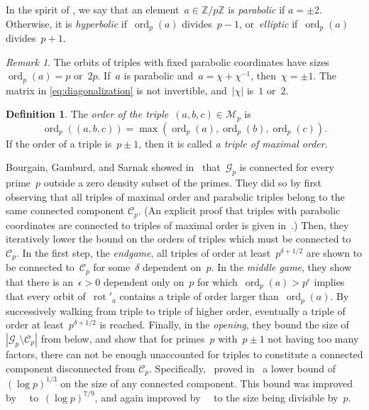 \documentclass{article}
\DeclareMathOperator{\rot}{rot}
\DeclareMathOperator{\ord}{ord}
\theoremstyle{definition}
\newtheorem{definition}{Definition}
\theoremstyle{remark}
\newtheorem{remark}{Remark}
\begin{document}
In the spirit of \cite{bgs}, we say that an element~$a \in \mathbb{Z}/p\mathbb{Z}$ is \textit{parabolic} if $a = \pm 2$.
Otherwise, it is \textit{hyperbolic} if~$\ord_p(a)$ divides~$p - 1$, or~\textit{elliptic} if~$\ord_p(a)$ divides~$p + 1$.

\begin{remark}\label{rmk:parabolic}
The orbits of triples with fixed parabolic coordinates have sizes~$\ord_p(a) = p$ or~$2p$.
If~$a$ is parabolic and~$a = \chi + \chi^{-1}$, then~$\chi = \pm 1$.
The matrix in \eqref{eq:diagonalization} is not invertible, and~$|\chi|$ is~$1$ or~$2$.
\end{remark}

\begin{definition}\label{def:triple-order}
    The \textit{order of the triple~$(a, b, c) \in \mathcal{M}_p$} is
    \[ \ord_p((a, b, c)) = \max(\ord_p(a), \ord_p(b), \ord_p(c)). \]
    If the order of a triple is~$p \pm 1$, then it is called \textit{a triple of maximal order}.
\end{definition}

Bourgain, Gamburd, and Sarnak showed in~\cite{bgs} that~$\mathcal{G}_p$ is connected for every prime~$p$ outside a zero density subset of the primes.
They did so by first observing that all triples of maximal order and parabolic triples belong to the same connected component $\mathcal{C}_p$.
(An explicit proof that triples with parabolic coordinates are connected to triples of maximal order is given in~\cite[Lemma 3.3]{bounding-lifts}.)
Then, they iteratively lower the bound on the orders of triples which must be connected to~$\mathcal{C}_p$.
In the first step, the \textit{endgame}, all triples of order at least~$p^{\delta + 1/2}$ are shown to be connected to~$\mathcal{C}_p$ for some~$\delta$ dependent on~$p$.
In the \textit{middle game}, they show that there is an~$\epsilon > 0$ dependent only on~$p$ for which~$\ord_p(a) > p^\epsilon$ implies that every orbit of~$\rot'_a$ contains a triple of order larger than~$\ord_p(a)$.
By successively walking from triple to triple of higher order, eventually a triple of order at least~$p^{\delta + 1/2}$ is reached.
Finally, in the \textit{opening}, they bound the size of~$|\mathcal{G}_p \setminus \mathcal{C}_p|$ from below, and show that for primes~$p$ with~$p \pm 1$ not having too many factors, there can not be enough unaccounted for triples to constitute a connected component disconnected from $\mathcal{C}_p$.
Specifically,~\citeauthor{bgs} proved in~\cite{bgs} a lower bound of $(\log p)^{1/3}$ on the size of any connected component.
This bound was improved by~\citeauthor{on-the-structure}~\cite{on-the-structure} to~$(\log p)^{7/9}$, and again improved by~\citeauthor{chen}~\cite{chen} to the size being divisible by~$p$.
\end{document}
